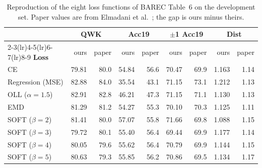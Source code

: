\begin{table}[H]
\centering
\footnotesize
\caption{Reproduction of the eight loss functions of BAREC Table~6 on the development set. Paper values are from Elmadani et al.~\cite{elmadani2025barec}; the gap is ours minus theirs.}
\label{tab:res-repro}
\begin{tabular}{lrrrrrrrr}
\toprule
& \multicolumn{2}{c}{\textbf{QWK}} & \multicolumn{2}{c}{\textbf{Acc19}} & \multicolumn{2}{c}{\textbf{$\pm$1 Acc19}} & \multicolumn{2}{c}{\textbf{Dist}} \\
\cmidrule(lr){2-3}\cmidrule(lr){4-5}\cmidrule(lr){6-7}\cmidrule(lr){8-9}
\textbf{Loss} & ours & paper & ours & paper & ours & paper & ours & paper \\
\midrule
CE & 79.81 & 80.0 & 54.84 & 56.6 & 70.47 & 69.9 & 1.163 & 1.14 \\
Regression (MSE) & 82.88 & 84.0 & 35.54 & 43.1 & 71.15 & 73.1 & 1.212 & 1.13 \\
OLL ($\alpha=1.5$) & 82.91 & 82.8 & 46.21 & 47.3 & 71.15 & 71.1 & 1.130 & 1.13 \\
EMD & 81.29 & 81.2 & 54.27 & 55.3 & 70.10 & 70.3 & 1.125 & 1.11 \\
SOFT ($\beta=2$) & 81.41 & 80.0 & 57.07 & 55.8 & 71.66 & 69.8 & 1.088 & 1.15 \\
SOFT ($\beta=3$) & 79.72 & 80.1 & 55.40 & 56.4 & 69.44 & 69.9 & 1.177 & 1.14 \\
SOFT ($\beta=4$) & 80.05 & 79.6 & 55.62 & 56.4 & 70.79 & 69.9 & 1.144 & 1.15 \\
SOFT ($\beta=5$) & 80.63 & 79.3 & 55.85 & 56.2 & 70.86 & 69.5 & 1.134 & 1.17 \\
\bottomrule
\end{tabular}
\end{table}
